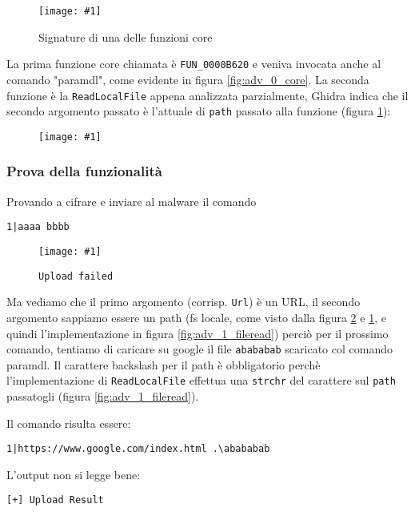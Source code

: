 \documentclass[
    a4paper, %
    11pt %
]{article}
\newcommand{\pic}[4]{\begin{figure}[H]
            \centering
            \texttt{[image: \#1]}
            \caption{#2}
            \label{fig:#1}
            \end{figure}}
\begin{document}
            \pic{adv_1_filesign}{Signature di una delle funzioni core}{18cm}{2cm}

            La prima funzione core chiamata è \texttt{FUN\_0000B620} e veniva invocata anche al comando "paramdl",
            come evidente in figura \ref{fig:adv_0_core}.
            La seconda funzione è la \texttt{ReadLocalFile} appena analizzata parzialmente, Ghidra
            indica che il secondo argomento passato è l'attuale di \texttt{path} passato alla funzione
            (figura \ref{fig:adv_1_filesign}):

            \pic{adv_1_secondpass}{}{18cm}{5cm}

            \subsubsection{Prova della funzionalità}

            Provando a cifrare e inviare al malware il comando 

            \begin{center}
            \texttt{1|aaaa bbbb}
            \end{center}
            
            \pic{adv_1_exec}{\texttt{Upload failed}}{19cm}{1cm}

            Ma vediamo che il primo argomento (corrisp. \texttt{Url}) è un URL, 
            il secondo argomento sappiamo essere un path (fs locale, come visto dalla figura \ref{fig:adv_1_secondpass} e 
            \ref{fig:adv_1_filesign}, e quindi l'implementazione in figura \ref{fig:adv_1_fileread})
            perciò per il prossimo comando, tentiamo di caricare su google il file \texttt{abababab} scaricato
            col comando paramdl. Il carattere backslash per il path è obbligatorio perchè l'implementazione
            di \texttt{ReadLocalFile} effettua una \texttt{strchr} del carattere sul \texttt{path} passatogli
            (figura \ref{fig:adv_1_fileread}). 
            
            Il comando risulta essere:

            \begin{center}
            \texttt{1|https://www.google.com/index.html .\textbackslash abababab}
            \end{center}
            
            L'output non si legge bene:
            
            \texttt{[+] Upload Result}
            
\end{document}
